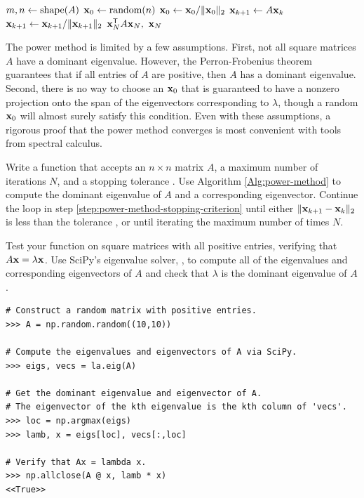\begin{algorithm}[H] %
\begin{algorithmic}[1]
    \State $m, n \gets \mathrm{shape}(A)$
    \State $\mathbf{x}_0 \gets \text{random}(n)$
    \State $\mathbf{x}_0 \gets \mathbf{x}_0/\|\mathbf{x}_0\|_2$
        \label{step:power-method-stopping-criterion}
        \State $\mathbf{x}_{k+1} \gets A\mathbf{x}_k$
        \label{step:power-method-main-step}
        \State $\mathbf{x}_{k+1} \gets \mathbf{x}_{k+1}/\|\mathbf{x}_{k+1}\|_2$
    \EndFor
    \State {} $\mathbf{x}_N^{\mathsf T} A \mathbf{x}_N,\ \mathbf{x}_N$
\EndProcedure
\end{algorithmic}
\caption{}
\label{Alg:power-method}
\end{algorithm}

The power method is limited by a few assumptions.
First, not all square matrices $A$ have a dominant eigenvalue.
However, the Perron-Frobenius theorem guarantees that if all entries of $A$ are positive, then $A$ has a dominant eigenvalue.
Second, there is no way to choose an $\mathbf{x}_0$ that is guaranteed to have a nonzero projection onto the span of the eigenvectors corresponding to $\lambda$, though a random $\mathbf{x}_0$ will almost surely satisfy this condition.
Even with these assumptions, a rigorous proof that the power method converges is most convenient with tools from spectral calculus.

\begin{problem} %
Write a function that accepts an $n \times n$ matrix $A$, a maximum number of iterations $N$, and a stopping tolerance .
Use Algorithm \ref{Alg:power-method} to compute the dominant eigenvalue of $A$ and a corresponding eigenvector.
Continue the loop in step \ref{step:power-method-stopping-criterion} until either $\|\mathbf{x}_{k+1} - \mathbf{x}_k\|_2$ is less than the tolerance , or until iterating the maximum number of times $N$.

Test your function on square matrices with all positive entries, verifying that $A\mathbf{x} = \lambda\mathbf{x}$.
Use SciPy's eigenvalue solver, , to compute all of the eigenvalues and corresponding eigenvectors of $A$ and check that $\lambda$ is the dominant eigenvalue of $A$.

\begin{lstlisting}
# Construct a random matrix with positive entries.
>>> A = np.random.random((10,10))

# Compute the eigenvalues and eigenvectors of A via SciPy.
>>> eigs, vecs = la.eig(A)

# Get the dominant eigenvalue and eigenvector of A.
# The eigenvector of the kth eigenvalue is the kth column of 'vecs'.
>>> loc = np.argmax(eigs)
>>> lamb, x = eigs[loc], vecs[:,loc]

# Verify that Ax = lambda x.
>>> np.allclose(A @ x, lamb * x)
<<True>>
\end{lstlisting}
\end{problem}

